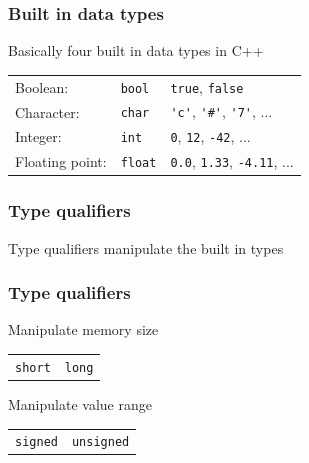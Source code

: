 \documentclass[14pt,a4paper,dvipsnames,usenames]{beamer}
\begin{document}
\begin{frame}[fragile]
  \frametitle{Built in data types}

  Basically four built in data types in C++

  \vspace{1em}
  {\renewcommand{\arraystretch}{1.5}
    \begin{tabular}{|l|l|l|} \hline
      Boolean: & \lstinline!bool! & \lstinline!true!, \lstinline!false!\\
      Character: & \lstinline!char! & \lstinline!'c'!, \lstinline!'#'!, \lstinline!'7'!, ... \\
      Integer: & \lstinline!int! & \lstinline!0!, \lstinline!12!, \lstinline!-42!, ... \\
      Floating point: \hspace{.2em} & \lstinline!float! \hspace{.2em} & \lstinline!0.0!, \lstinline!1.33!, \lstinline!-4.11!, ... \\ \hline
    \end{tabular}
  }
 
\end{frame}

\begin{frame}[fragile]
  \frametitle{Type qualifiers}

  \large Type qualifiers manipulate the built in types

\end{frame}

\begin{frame}[fragile]
  \frametitle{Type qualifiers}

  Manipulate memory size
  \begin{center}
    \begin{tabular}{cc}
      \lstinline!short! & \lstinline!long!
    \end{tabular}
  \end{center}

  \vspace{1em}

  Manipulate value range
  \begin{center}
    \begin{tabular}{cc}
      \lstinline!signed! & \lstinline!unsigned!
    \end{tabular}
  \end{center}

\end{frame}
\end{document}
